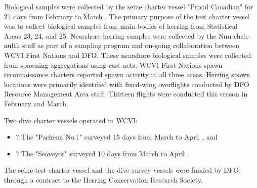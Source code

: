 Biological samples were collected by the seine charter vessel "Proud Canadian"
for 21 days from February  to March .
The primary purpose of the test charter vessel was to collect biological samples from
main bodies of herring from Statistical Areas 23, 24, and 25.
Nearshore herring samples were collected by the Nuu-chah-nulth staff
as part of a sampling program and on-going collaboration between WCVI First Nations and DFO.
These nearshore biological samples were collected from spawning aggregations using cast nets.
WCVI First Nations spawn reconnaissance charters reported spawn activity in all three areas.
Herring spawn locations were primarily identified with fixed-wing overflights conducted by
DFO Resource Management Area staff.
Thirteen flights were conducted this season in February and March.

Two dive charter vessels operated in WCVI:
\begin{itemize}
\item? The "Pachena No.1" surveyed 15 days from March  to April , and
\item? The "Seaveyor" surveyed 10 days from March  to April .
\end{itemize}
The seine test charter vessel and the dive survey vessels were funded by DFO,
through a contract to the Herring Conservation Research Society.
